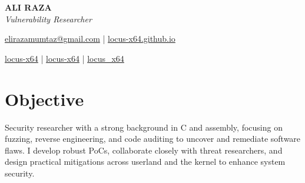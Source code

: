\documentclass[a4paper,11pt]{article}
\newcommand{\socialicon}[1]{\raisebox{-0.05em}{\resizebox{!}{1em}{#1}}}
\newcommand{\headerfontiii}{\fontfamily{ppl}\selectfont} %
\begin{document}
\headerfontiii

\begin{center}
    {\Huge\textbf{ALI RAZA}}\\[2mm]

    {\textit{Vulnerability Researcher}}
\end{center}
\vspace{-5mm}

\begin{center}
    \small{
    \href{mailto:elirazamumtaz@gmail.com}{elirazamumtaz@gmail.com} | 
    \href{https://locus-x64.github.io/}{locus-x64.github.io}
    }
\end{center}
\vspace{-5mm}

\begin{center}
    \small{
    \socialicon{\faLinkedin} \href{https://www.linkedin.com/in/locus-x64/}{locus-x64} | 
    \socialicon{\faGithub} \href{https://github.com/locus-x64}{locus-x64} |
    \socialicon{\faTwitter} \href{https://twitter.com/locus_x64}{locus\_x64}
    }
\end{center}

\vspace{-4mm}

\section{\textbf{Objective}}
\vspace{1mm}
\small{
Security researcher with a strong background in C and assembly, focusing on fuzzing, reverse engineering, and code auditing to uncover and remediate software flaws. I develop robust PoCs, collaborate closely with threat researchers, and design practical mitigations across userland and the kernel to enhance system security.
}
\vspace{-2mm}
\end{document}

